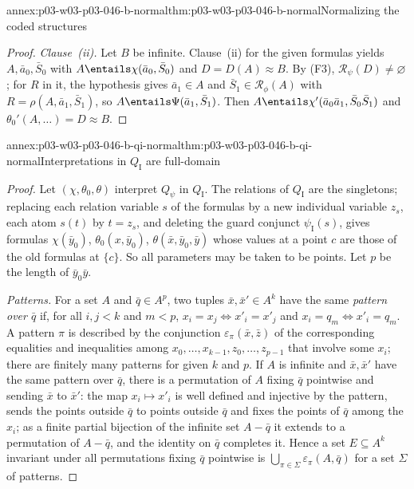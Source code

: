 \begin{annexitem}{annex:p03-w03-p03-046-b-normal}{thm:p03-w03-p03-046-b-normal}{Normalizing the coded structures}
\begin{proof}
\emph{Clause~(ii).} Let \(B\) be infinite. Clause~(ii) for the given
formulas yields \(A,\bar a_0,\bar S_0\) with \(A\entails\chi(\bar a_0,\bar
S_0)\) and \(D=D(A)\approx B\). By (F3), \(\mathscr
R_\psi(D)\neq\varnothing\); for \(R\) in it, the hypothesis gives \(\bar
a_1\in A\) and \(\bar S_1\in\mathscr R_\phi(A)\) with \(R=\rho(A,\bar
a_1,\bar S_1)\), so \(A\entails\Psi(\bar a_1,\bar S_1)\). Then \(A\entails
\chi'(\bar a_0\bar a_1,\bar S_0\bar S_1)\) and \(\theta_0'(A,\dots)=D\approx
B\).
\end{proof}
\end{annexitem}

\begin{annexitem}{annex:p03-w03-p03-046-b-qi-normal}{thm:p03-w03-p03-046-b-qi-normal}{Interpretations in \(Q_{\mathrm I}\) are full-domain}
\begin{proof}
Let \((\chi,\theta_0,\theta)\) interpret \(Q_\psi\) in \(Q_{\mathrm I}\).
The relations of \(Q_{\mathrm I}\) are the singletons; replacing each
relation variable \(s\) of the formulas by a new individual variable
\(z_s\), each atom \(s(t)\) by \(t=z_s\), and deleting the guard conjunct
\(\psi_{\mathrm I}(s)\), gives formulas \(\chi(\bar y_0)\),
\(\theta_0(x,\bar y_0)\), \(\theta(\bar x,\bar y_0,\bar y)\) whose values at
a point \(c\) are those of the old formulas at \(\{c\}\). So all parameters
may be taken to be points. Let \(p\) be the length of \(\bar y_0\bar y\).

\emph{Patterns.} For a set \(A\) and \(\bar q\in A^p\), two tuples
\(\bar x,\bar x'\in A^k\) have the same \emph{pattern over \(\bar q\)} if,
for all \(i,j<k\) and \(m<p\), \(x_i=x_j\iff x'_i=x'_j\) and \(x_i=q_m\iff
x'_i=q_m\). A pattern \(\pi\) is described by the conjunction
\(\varepsilon_\pi(\bar x,\bar z)\) of the corresponding equalities and
inequalities among \(x_0,\dots,x_{k-1},z_0,\dots,z_{p-1}\) that involve
some \(x_i\); there are finitely many patterns for given \(k\) and \(p\). If
\(A\) is infinite and \(\bar x,\bar x'\) have the same pattern over \(\bar
q\), there is a permutation of \(A\) fixing \(\bar q\) pointwise and
sending \(\bar x\) to \(\bar x'\): the map \(x_i\mapsto x'_i\) is well
defined and injective by the pattern, sends the points outside \(\bar q\)
to points outside \(\bar q\) and fixes the points of \(\bar q\) among the
\(x_i\); as a finite partial bijection of the infinite set \(A-\bar q\) it
extends to a permutation of \(A-\bar q\), and the identity on \(\bar q\)
completes it. Hence a set \(E\subseteq A^k\) invariant under all
permutations fixing \(\bar q\) pointwise is
\(\bigcup_{\pi\in\Sigma}\varepsilon_\pi(A,\bar q)\) for a set \(\Sigma\) of
patterns.


\end{proof}
\end{annexitem}

